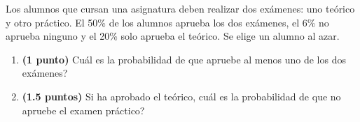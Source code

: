 
Los alumnos que cursan una asignatura deben realizar dos exámenes: uno teórico y otro práctico. El 50\% de los alumnos aprueba los dos exámenes, el 6\% no aprueba ninguno y el 20\% solo aprueba el teórico. Se elige un alumno al azar.
\begin{enumerate}[label=\alph*)]
\item \textbf{(1 punto)} \textquestiondown{}Cuál es la probabilidad de que apruebe al menos uno de los dos exámenes?
\item \textbf{(1.5 puntos)} Si ha aprobado el teórico, \textquestiondown{}cuál es la probabilidad de que no apruebe el examen práctico?
\end{enumerate}
